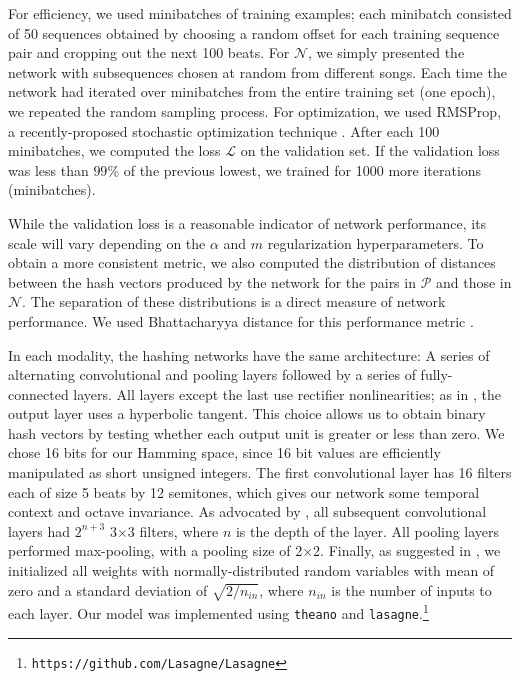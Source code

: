 \documentclass{article}
\begin{document}
For efficiency, we used minibatches of training examples; each minibatch consisted of 50 sequences obtained by choosing a random offset for each training sequence pair and cropping out the next 100 beats.  
For $\mathcal{N}$, we simply presented the network with subsequences chosen at random from different songs. 
Each time the network had iterated over minibatches from the entire training set (one epoch), we repeated the random sampling process. 
For optimization, we used RMSProp, a recently-proposed stochastic optimization technique \cite{tieleman2012lecture}.
After each 100 minibatches, we computed the loss $\mathcal{L}$ on the validation set.
If the validation loss was less than $99\%$ of the previous lowest, we trained for 1000 more iterations (minibatches).

While the validation loss is a reasonable indicator of network performance, its scale will vary depending on the $\alpha$ and $m$ regularization hyperparameters.
To obtain a more consistent metric, we also computed the distribution of distances between the hash vectors produced by the network for the pairs in $\mathcal{P}$ and those in $\mathcal{N}$.
The separation of these distributions is a direct measure of network performance. 
We used Bhattacharyya distance for this performance metric \cite{bhattacharyya1943measure}.

In each modality, the hashing networks have the same architecture: A series of alternating convolutional and pooling layers followed by a series of fully-connected layers.
All layers except the last use rectifier nonlinearities; as in \cite{masci2014multimodal}, the output layer uses a hyperbolic tangent.
This choice allows us to obtain binary hash vectors by testing whether each output unit is greater or less than zero.
We chose 16 bits for our Hamming space, since 16 bit values are efficiently manipulated as short unsigned integers.
The first convolutional layer has 16 filters each of size 5 beats by 12 semitones, which gives our network some temporal context and octave invariance.
As advocated by \cite{simonyan2014very}, all subsequent convolutional layers had $2^{n + 3}$ 3$\times$3 filters, where $n$ is the depth of the layer.
All pooling layers performed max-pooling, with a pooling size of 2$\times$2.
Finally, as suggested in \cite{he2015delving}, we initialized all weights with normally-distributed random variables with mean of zero and a standard deviation of $\sqrt{2/n_{in}}$, where $n_{in}$ is the number of inputs to each layer.
Our model was implemented using \texttt{theano} \cite{bastien2012theano} and \texttt{lasagne}.\footnote{\texttt{https://github.com/Lasagne/Lasagne}}
\end{document}
